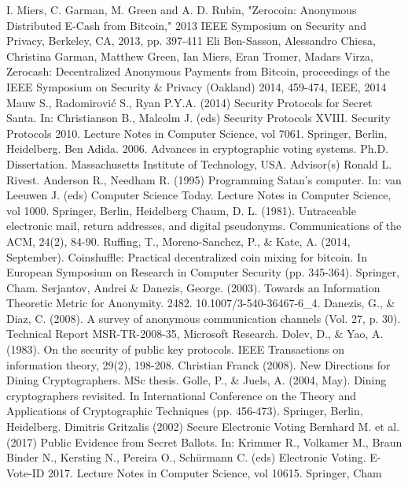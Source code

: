 \begin{thebibliography}{9}

 I. Miers, C. Garman, M. Green and A. D. Rubin, "Zerocoin: Anonymous Distributed E-Cash from Bitcoin," 2013 IEEE Symposium on Security and Privacy, Berkeley, CA, 2013, pp. 397-411
 Eli Ben-Sasson, Alessandro Chiesa, Christina Garman, Matthew Green, Ian Miers, Eran Tromer, Madars Virza, Zerocash: Decentralized Anonymous Payments from Bitcoin, proceedings of the IEEE Symposium on Security \& Privacy (Oakland) 2014, 459-474, IEEE, 2014
 Mauw S., Radomirović S., Ryan P.Y.A. (2014) Security Protocols for Secret Santa. In: Christianson B., Malcolm J. (eds) Security Protocols XVIII. Security Protocols 2010. Lecture Notes in Computer Science, vol 7061. Springer, Berlin, Heidelberg. 
 Ben Adida. 2006. Advances in cryptographic voting systems. Ph.D. Dissertation. Massachusetts Institute of Technology, USA. Advisor(s) Ronald L. Rivest.
 Anderson R., Needham R. (1995) Programming Satan's computer. In: van Leeuwen J. (eds) Computer Science Today. Lecture Notes in Computer Science, vol 1000. Springer, Berlin, Heidelberg
 Chaum, D. L. (1981). Untraceable electronic mail, return addresses, and digital pseudonyms. Communications of the ACM, 24(2), 84-90.
 Ruffing, T., Moreno-Sanchez, P., \& Kate, A. (2014, September). Coinshuffle: Practical decentralized coin mixing for bitcoin. In European Symposium on Research in Computer Security (pp. 345-364). Springer, Cham.
 Serjantov, Andrei \& Danezis, George. (2003). Towards an Information Theoretic Metric for Anonymity. 2482. 10.1007/3-540-36467-6\_4.
 Danezis, G., \& Diaz, C. (2008). A survey of anonymous communication channels (Vol. 27, p. 30). Technical Report MSR-TR-2008-35, Microsoft Research.
 Dolev, D., \& Yao, A. (1983). On the security of public key protocols. IEEE Transactions on information theory, 29(2), 198-208.
 Christian Franck (2008). New Directions for Dining Cryptographers. MSc thesis.
 Golle, P., \& Juels, A. (2004, May). Dining cryptographers revisited. In International Conference on the Theory and Applications of Cryptographic Techniques (pp. 456-473). Springer, Berlin, Heidelberg.
 Dimitris Gritzalis (2002) Secure Electronic Voting
 Bernhard M. et al. (2017) Public Evidence from Secret Ballots. In: Krimmer R., Volkamer M., Braun Binder N., Kersting N., Pereira O., Schürmann C. (eds) Electronic Voting. E-Vote-ID 2017. Lecture Notes in Computer Science, vol 10615. Springer, Cham 

\end{thebibliography}

